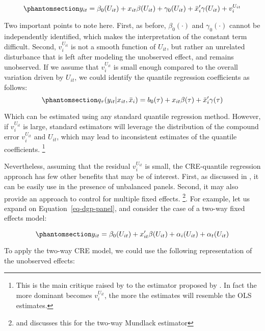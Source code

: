 \documentclass[bib]{statapress}
\begin{document}
\begin{equation}\phantomsection\label{eq-cre-dgp}{y_{it} = \beta_0(U_{it}) + x_{it}\beta(U_{it}) + \gamma_0(U_{it}) + \bar x_i'\gamma(U_{it}) + v^{U_{it}}_i 
}\end{equation}

Two important points to note here. First, as before, \(\beta_0(\cdot)\)
and \(\gamma_0(\cdot)\) cannot be independently identified, which makes
the interpretation of the constant term difficult. Second,
\(v^{U_{it}}_i\) is not a smooth function of \(U_{it}\), but rather an
unrelated disturbance that is left after modeling the unobserved effect,
and remains unobserved. If we assume that \(v^{U_{it}}_i\) is small
enough compared to the overall variation driven by \(U_{it}\), we could
identify the quantile regression coefficients as follows:
\begin{equation}\phantomsection\label{eq-cre-1way}{q_\tau(y_{it}|x_{it},\bar x_i)=b_0(\tau) + x_{it}\beta(\tau)+\bar x_i'\gamma(\tau)
}\end{equation}

Which can be estimated using any standard quantile regression method.
However, if \(v^{U_{it}}_i\) is large, standard estimators will leverage
the distribution of the compound error \(v^{U_{it}}_i\) and \(U_{it}\),
which may lead to inconsistent estimates of the quantile coefficients.
\footnote{This is the main critique raised by \citet{canay2011} to the
  estimator proposed by \citet{abrevaya2008}. In fact the more dominant
  becomes \(v^{U_{it}}_i\), the more the estimates will resemble the OLS
  estimates.}

Nevertheless, assuming that the residual \(v^{U_{it}}_i\) is small, the
CRE-quantile regression approach has few other benefits that may be of
interest. First, as discussed in \citet{wooldridge2019}, it can be
easily use in the presence of unbalanced panels. Second, it may also
provide an approach to control for multiple fixed effects. \footnote{\citet{baltagi2023}
  and \citet{wooldridge2021} discusses this for the two-way Mundlack
  estimator}. For example, let us expand on Equation~\ref{eq-dgp-panel},
and consider the case of a two-way fixed effects model:

\begin{equation}\phantomsection\label{eq-dgp-panel}{y_{it} = \beta_0(U_{it}) + x_{it}'\beta(U_{it}) + \alpha_i(U_{it}) + \alpha_t(U_{it})
}\end{equation}

To apply the two-way CRE model, we could use the following
representation of the unobserved effects:
\end{document}
